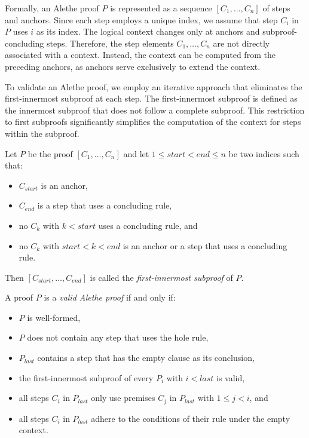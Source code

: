 Formally, an Alethe proof $P$ is represented as a sequence $[C_1, \ldots, C_n]$ of steps and anchors.
Since each step employs a unique index, we assume that step $C_i$ in $P$ uses
$i$ as its index. The logical context changes only at anchors and subproof-concluding
steps. Therefore, the step elements $C_1, \ldots, C_n$ are not directly associated
with a context. Instead, the context can be computed from the preceding anchors,
as anchors serve exclusively to extend the context.

To validate an Alethe proof, we employ an iterative approach that eliminates the first-innermost
subproof at each step. The first-innermost subproof is defined as the innermost subproof that does not
follow a complete subproof. This restriction to first subproofs significantly simplifies the computation of
the context for steps within the subproof.

\begin{definition}\label{def:first-innermost}
Let $P$ be the proof $[C_1, \ldots, C_n]$ and let $1 \leq \mathit{start} < \mathit{end} \leq n$ be two indices such
that:
\begin{itemize}
\item $C_{\mathit{start}}$ is an anchor,
\item $C_{\mathit{end}}$ is a step that uses a concluding rule,
\item no $C_k$ with $k < \mathit{start}$ uses a concluding rule, and
\item no $C_k$ with $\mathit{start} < k < \mathit{end}$ is an anchor or a step that uses a concluding rule.
\end{itemize}
Then $[C_{\mathit{start}}, \ldots, C_{\mathit{end}}]$ is called the \emph{first-innermost subproof} of $P$.
\end{definition}

\begin{definition}\label{def:valid-alethe-proof}
A proof $P$ is a \emph{valid Alethe proof} if and only if:
\begin{itemize}
\item $P$ is well-formed,
\item $P$ does not contain any step that uses the hole rule,
\item $P_{\mathit{last}}$ contains a step that has the empty clause as its conclusion,
\item the first-innermost subproof of every $P_i$ with $i < \mathit{last}$ is valid,
\item all steps $C_i$ in $P_{\mathit{last}}$ only use premises $C_j$ in $P_{\mathit{last}}$ with $1 \leq j < i$, and
\item all steps $C_i$ in $P_{\mathit{last}}$ adhere to the conditions of their rule under the empty context.
\end{itemize}
\end{definition}

